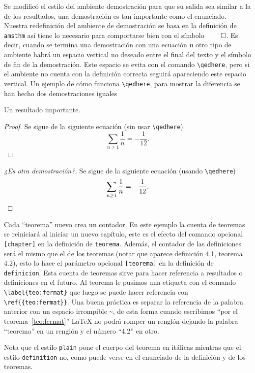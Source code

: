 Se modificó el estilo del ambiente demostración para que su salida sea
similar a la de los resultados, una demostración es tan importante como el
enunciado. Nuestra redefinición del ambiente de demostración se basa en la
definición de \texttt{amsthm} así tiene lo necesario para comportarse bien
con el símbolo \(\qed \). Es decir, cuando se termina una demostración con
una ecuación u otro tipo de ambiente habrá un espacio vertical no deseado
entre el final del texto y el símbolo de fin de la demostración. Este
espacio se evita con el comando \verb|\qedhere|, pero si el ambiente no
cuenta con la definición correcta seguirá apareciendo este espacio vertical.
Un ejemplo de cómo funciona \verb|\qedhere|, para mostrar la diferencia se
han hecho dos demostraciones iguales

\begin{teorema}
  Un resultado importante.
\end{teorema}
\begin{proof}
  Se sigue de la siguiente ecuación (sin usar \verb|\qedhere|)
  \[
    \sum_{n\geq 1}\frac{1}{n}=-\frac{1}{12}.
  \]
\end{proof}
\begin{proof}[¿Es otra demostración?]
  Se sigue de la siguiente ecuación (usando \verb|\qedhere|)
  \[
    \sum_{n\geq 1}\frac{1}{n}=-\frac{1}{12}. \qedhere
  \]
\end{proof}

Cada \enquote{teorema} nuevo crea un contador. En este ejemplo la cuenta de
teoremas se reiniciará al iniciar un nuevo capítulo, este es el efecto del
comando opcional \texttt{[chapter]} en la definición de \texttt{teorema}.
Además, el contador de las definiciones será el mismo que el de los teoremas
(notar que aparece definición 4.1, teorema 4.2), esto lo hace el parámetro
opcional \texttt{[teorema]} en la definición de \texttt{definicion}. Esta
cuenta de teoremas sirve para hacer referencia a resultados o definiciones
en el futuro. Al teorema le pusimos una etiqueta con el comando
\verb|\label{teo:fermat}| que luego se puede hacer referencia con
\verb|\ref{{teo:fermat}}|. Una buena práctica es separar la referencia de la
palabra anterior con un espacio irrompible \verb|~|, de esta forma cuando
escribimos \enquote{por el teorema~\ref{teo:fermat}} \LaTeX{} no podrá romper un
renglón dejando la palabra \enquote{teorema} en un renglón y el número \enquote{4.2} en
otro.

Nota que el estilo \texttt{plain} pone el cuerpo del teorema en itálicas
mientras que el estilo \texttt{definition} no, como puede verse en el
enunciado de la definición y de los teoremas.

